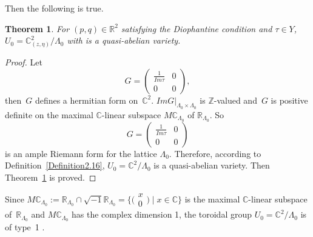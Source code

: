 \documentclass[10pt,a4paper]{amsart}
\numberwithin{equation}{section}
\newtheorem{Theorem}{Theorem}[section]
\def\operatorname#1{#1}
\begin{document}
Then the following is true.

\begin{Theorem}\label{Theorem2.17}
For $(p,q) \in \mathbb{R}^2$ satisfying the Diophantine condition and $\tau \in Y$, $U_0={\mathbb{C}^2_{(z,\eta)}}/{\Lambda_0}$ with  is a quasi-abelian variety.
\end{Theorem}

\begin{proof}
Let
\[
G=\left(\begin{matrix}\frac{1}{\operatorname{\operatorname{Im}}\tau} & 0\\0 & 0\end{matrix}\right),
\]
 then~$G$ defines a hermitian form on~$\mathbb{C}^2$. $\operatorname{ Im}G|_{\Lambda_0\times \Lambda_0}$ is $\mathbb{Z}$-valued and~$G$ is positive definite on the maximal $\mathbb{C}$-linear subspace $M\mathbb{C}_{\Lambda_0}$ of $\mathbb{R}_{\Lambda_{0}}$. So
 \[
 G=\left(\begin{matrix}\frac{1}{\operatorname{\operatorname{Im}}\tau} & 0\\0 & 0\end{matrix}\right)
 \]
 is an ample Riemann form for the lattice $\Lambda_0$. Therefore, according to Definition~\ref{Definition2.16}, $U_0=\mathbb{C}^2/\Lambda_0$ is a quasi-abelian variety. Then Theorem~\ref{Theorem2.17} is proved.
\end{proof}

Since $M\mathbb{C}_{\Lambda_0}:=\mathbb{R}_{\Lambda_0}\cap\sqrt{-1}\mathbb{R}_{\Lambda_0}=\big \{ \bigl(\begin{smallmatrix}x \\0\end{smallmatrix}\bigr)\mid x\in \mathbb{C}\big \}$ is the maximal $\mathbb{C}$-linear subspace of~$\mathbb{R}_{\Lambda_0}$ and $M\mathbb{C}_{\Lambda_0}$ has the complex dimension 1, the toroidal group $U_0=\mathbb{C}^2/\Lambda_0$ is of type~1 \cite[Defi\-nition~1.2.1]{Yukitaka-Klaus}.
\end{document}
